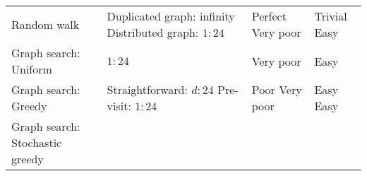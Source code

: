 \documentclass[10pt,oneside]{memoir}
\begin{document}
\begin{longtable}[]{@{}llll@{}}
\begin{minipage}[t]{0.25\columnwidth}\raggedright
Random walk\strut
\end{minipage} & \begin{minipage}[t]{0.37\columnwidth}\raggedright
Duplicated graph: infinity \linebreak Distributed graph:
\(1 : 24\)\strut
\end{minipage} & \begin{minipage}[t]{0.12\columnwidth}\raggedright
Perfect \linebreak Very poor\strut
\end{minipage} & \begin{minipage}[t]{0.14\columnwidth}\raggedright
Trivial \linebreak Easy\strut
\end{minipage}\tabularnewline
\begin{minipage}[t]{0.25\columnwidth}\raggedright
Graph search: Uniform\strut
\end{minipage} & \begin{minipage}[t]{0.37\columnwidth}\raggedright
\(1 : 24\)\strut
\end{minipage} & \begin{minipage}[t]{0.12\columnwidth}\raggedright
Very poor\strut
\end{minipage} & \begin{minipage}[t]{0.14\columnwidth}\raggedright
Easy\strut
\end{minipage}\tabularnewline
\begin{minipage}[t]{0.25\columnwidth}\raggedright
Graph search: Greedy\strut
\end{minipage} & \begin{minipage}[t]{0.37\columnwidth}\raggedright
Straightforward: \(d : 24\) \linebreak Pre-visit: \(1:24\)\strut
\end{minipage} & \begin{minipage}[t]{0.12\columnwidth}\raggedright
Poor \linebreak Very poor\strut
\end{minipage} & \begin{minipage}[t]{0.14\columnwidth}\raggedright
Easy \linebreak Easy\strut
\end{minipage}\tabularnewline
\begin{minipage}[t]{0.25\columnwidth}\raggedright
Graph search: Stochastic greedy\strut
\end{minipage} & \begin{minipage}[t]{0.37\columnwidth}\raggedright

\end{minipage}
\end{longtable}
\end{document}
